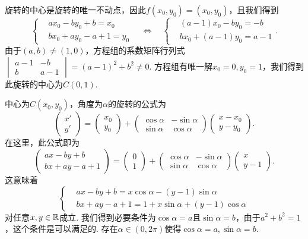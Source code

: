 \begin{solution}
  旋转的中心是旋转的唯一不动点，因此$f(x_0,y_0)=(x_0,y_0)$，且我们得到
  \[
    \left\{
      \begin{aligned}
        & ax_0 - by_0 + b = x_0 \\
        & bx_0 + ay_0 - a + 1 = y_0
      \end{aligned}
    \right.\quad \Leftrightarrow \quad
    \left\{
      \begin{aligned}
        & (a - 1)x_0 - by_0 = -b \\
        & bx_0 + (a - 1)y_0 = a - 1
      \end{aligned}
    \right..
  \]
  由于$(a,b)\ne(1,0)$，方程组的系数矩阵行列式$\begin{vmatrix}
    a - 1 & -b \\
    b & a - 1
  \end{vmatrix}=(a - 1)^2 + b^2\ne0$. 方程组有唯一解$x_0=0,y_0=1$，我们得到此旋转的中心为$C(0,1)$.

  中心为$C(x_0,y_0)$，角度为$\alpha$的旋转的公式为
  \[
    \begin{pmatrix}
      x' \\
      y'
    \end{pmatrix} =
    \begin{pmatrix}
      x_0 \\
      y_0
    \end{pmatrix} +
    \begin{pmatrix}
      \cos\alpha & - \sin\alpha \\
      \sin\alpha & \cos\alpha
    \end{pmatrix}
    \begin{pmatrix}
      x - x_0 \\
      y - y_0
    \end{pmatrix}.
  \]
  在这里，此公式即为
  \[
    \begin{pmatrix}
      ax - by + b \\
      bx + ay - a + 1
    \end{pmatrix} = 
    \begin{pmatrix}
      0 \\
      1
    \end{pmatrix} +
    \begin{pmatrix}
      \cos\alpha & - \sin\alpha \\
      \sin\alpha & \cos\alpha
    \end{pmatrix}
    \begin{pmatrix}
      x \\
      y - 1
    \end{pmatrix}.
  \] 
  这意味着
  \[
    \left\{
      \begin{aligned}
        & ax - by + b = x\cos\alpha - (y - 1)\sin\alpha \\
        & bx + ay - a + 1 = 1 + x\sin\alpha + (y - 1)\cos\alpha
      \end{aligned}
    \right.
  \]
  对任意$x,y\in\mathbb R$成立. 我们得到必要条件为$\cos\alpha=a$且$\sin\alpha=b$，由于$a^2+b^2=1$，这个条件是可以满足的. 存在$\alpha\in(0,2\pi)$使得$\cos\alpha=a,\sin\alpha=b$.
\end{solution}

